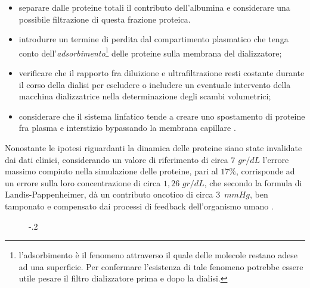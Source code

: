 \begin{description}
\begin{itemize}
	\item separare dalle proteine totali il contributo dell'albumina e considerare una possibile filtrazione di questa frazione proteica.
	\item introdurre un termine di perdita dal compartimento plasmatico che tenga conto dell'\textit{adsorbimento}\footnote{l'adsorbimento è il fenomeno attraverso il quale delle molecole restano adese ad una superficie. Per confermare l'esistenza di tale fenomeno potrebbe essere utile pesare il filtro dializzatore prima e dopo la dialisi.} delle proteine sulla membrana del dializzatore;
	\item verificare che il rapporto fra diluizione e ultrafiltrazione resti costante durante il corso della dialisi per escludere o includere un eventuale intervento della macchina dializzatrice nella determinazione degli scambi volumetrici;
	\item considerare che il sistema linfatico tende a creare uno spostamento di proteine fra plasma e interstizio bypassando la membrana capillare \cite{guyton}.
\end{itemize}
Nonostante le ipotesi riguardanti la dinamica delle proteine siano state invalidate dai dati clinici, considerando un valore di riferimento di circa $7$ $gr/dL$ l'errore massimo compiuto nella simulazione delle proteine, pari al $17\%$, corrisponde ad un errore sulla loro concentrazione di circa $1,26$ $gr/dL$, che secondo la formula di Landis-Pappenheimer, dà un contributo oncotico di circa $3$~$mmHg$, ben tamponato e compensato dai processi di feedback dell'organismo umano \cite{guyton}.
\begin{figure}[t]
	\centering
	\advance\leftskip-.2\textwidth

\end{figure}
\end{description}
